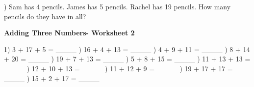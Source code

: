 \documentclass{article}%
\begin{document}
\newline%
\newline%
) Sam has 4 pencils. James has 5 pencils. Rachel has 19 pencils. How many pencils do they have in all?%
\newline%
\newline%
\newline%
\pagebreak%
\large%
\begin{center}%
\textbf{Adding Three Numbers- Worksheet 2}%
\newline%
\newline%
\newline%
\end{center} \normalsize%
1) 3 + 17 + 5 = \_\_\_\_%
\newline%
\newline%
) 16 + 4 + 13 = \_\_\_\_%
\newline%
\newline%
) 4 + 9 + 11 = \_\_\_\_%
\newline%
\newline%
) 8 + 14 + 20 = \_\_\_\_%
\newline%
\newline%
) 19 + 7 + 13 = \_\_\_\_%
\newline%
\newline%
) 5 + 8 + 15 = \_\_\_\_%
\newline%
\newline%
) 11 + 13 + 13 = \_\_\_\_%
\newline%
\newline%
) 12 + 10 + 13 = \_\_\_\_%
\newline%
\newline%
) 11 + 12 + 9 = \_\_\_\_%
\newline%
\newline%
) 19 + 17 + 17 = \_\_\_\_%
\newline%
\newline%
) 15 + 2 + 17 = \_\_\_\_%
\newline%
\newline%
\end{document}
